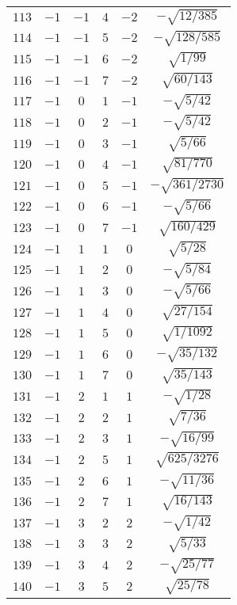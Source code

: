 \begin{table}
\begin{center}
\begin{tabular}{|c|c|c|c|c|c|}
$113$ & $-1$ & $-1$ & $4$ & $-2$ & $-\sqrt{12/385}$ \\ 
$114$ & $-1$ & $-1$ & $5$ & $-2$ & $-\sqrt{128/585}$ \\ 
$115$ & $-1$ & $-1$ & $6$ & $-2$ & $\sqrt{1/99}$ \\ 
$116$ & $-1$ & $-1$ & $7$ & $-2$ & $\sqrt{60/143}$ \\ 
$117$ & $-1$ & $0$ & $1$ & $-1$ & $-\sqrt{5/42}$ \\ 
$118$ & $-1$ & $0$ & $2$ & $-1$ & $-\sqrt{5/42}$ \\ 
$119$ & $-1$ & $0$ & $3$ & $-1$ & $\sqrt{5/66}$ \\ 
$120$ & $-1$ & $0$ & $4$ & $-1$ & $\sqrt{81/770}$ \\ 
$121$ & $-1$ & $0$ & $5$ & $-1$ & $-\sqrt{361/2730}$ \\ 
$122$ & $-1$ & $0$ & $6$ & $-1$ & $-\sqrt{5/66}$ \\ 
$123$ & $-1$ & $0$ & $7$ & $-1$ & $\sqrt{160/429}$ \\ 
$124$ & $-1$ & $1$ & $1$ & $0$ & $\sqrt{5/28}$ \\ 
$125$ & $-1$ & $1$ & $2$ & $0$ & $-\sqrt{5/84}$ \\ 
$126$ & $-1$ & $1$ & $3$ & $0$ & $-\sqrt{5/66}$ \\ 
$127$ & $-1$ & $1$ & $4$ & $0$ & $\sqrt{27/154}$ \\ 
$128$ & $-1$ & $1$ & $5$ & $0$ & $\sqrt{1/1092}$ \\ 
$129$ & $-1$ & $1$ & $6$ & $0$ & $-\sqrt{35/132}$ \\ 
$130$ & $-1$ & $1$ & $7$ & $0$ & $\sqrt{35/143}$ \\ 
$131$ & $-1$ & $2$ & $1$ & $1$ & $-\sqrt{1/28}$ \\ 
$132$ & $-1$ & $2$ & $2$ & $1$ & $\sqrt{7/36}$ \\ 
$133$ & $-1$ & $2$ & $3$ & $1$ & $-\sqrt{16/99}$ \\ 
$134$ & $-1$ & $2$ & $5$ & $1$ & $\sqrt{625/3276}$ \\ 
$135$ & $-1$ & $2$ & $6$ & $1$ & $-\sqrt{11/36}$ \\ 
$136$ & $-1$ & $2$ & $7$ & $1$ & $\sqrt{16/143}$ \\ 
$137$ & $-1$ & $3$ & $2$ & $2$ & $-\sqrt{1/42}$ \\ 
$138$ & $-1$ & $3$ & $3$ & $2$ & $\sqrt{5/33}$ \\ 
$139$ & $-1$ & $3$ & $4$ & $2$ & $-\sqrt{25/77}$ \\ 
$140$ & $-1$ & $3$ & $5$ & $2$ & $\sqrt{25/78}$ \\ 

\end{tabular}
\end{center}
\end{table}
